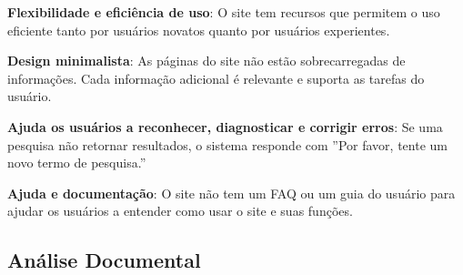 \textbf{Flexibilidade e eficiência de uso}: O site tem recursos que permitem o uso eficiente tanto por usuários novatos quanto por usuários experientes.

\textbf{Design minimalista}: As páginas do site não estão sobrecarregadas de informações. Cada informação adicional é relevante e suporta as tarefas do usuário.

\textbf{Ajuda os usuários a reconhecer, diagnosticar e corrigir erros}: Se uma pesquisa não retornar resultados, o sistema responde com ''Por favor, tente um novo termo de pesquisa.''

\textbf{Ajuda e documentação}: O site não tem um FAQ ou um guia do usuário para ajudar os usuários a entender como usar o site e suas funções.

\subsection{Análise Documental}

